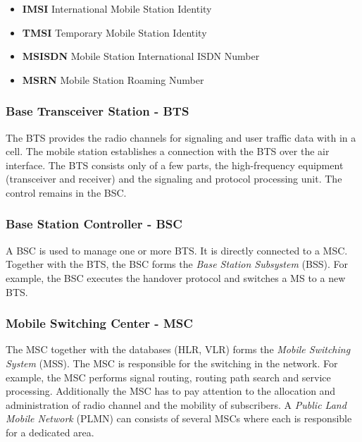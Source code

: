 \documentclass[master,english]{hgbthesis}
\begin{document}
\begin{itemize}

	\item \textbf{IMSI} International Mobile Station Identity

	\item \textbf{TMSI} Temporary Mobile Station Identity

	\item \textbf{MSISDN} Mobile Station International ISDN Number

	\item \textbf{MSRN} Mobile Station Roaming Number

\end{itemize}

\subsubsection{Base Transceiver Station - BTS}

The BTS provides the radio channels for signaling and user traffic data with in a cell. The mobile station establishes a connection with the BTS over the air interface. The BTS consists only of a few parts, the high-frequency equipment (transceiver and receiver) and the signaling and protocol processing unit. The control remains in the BSC.

\subsubsection{Base Station Controller - BSC}

A BSC is used to manage one or more BTS. It is directly connected to a MSC. Together with the BTS, the BSC forms the \emph{Base Station Subsystem} (BSS). For example, the BSC executes the handover protocol and switches a MS to a new BTS.

\subsubsection{Mobile Switching Center - MSC}

The MSC together with the databases (HLR, VLR) forms the \emph{Mobile Switching System} (MSS). The MSC is responsible for the switching in the network. For example, the MSC performs signal routing, routing path search and service processing. Additionally the MSC has to pay attention to the allocation and administration of radio channel and the mobility of subscribers. A \emph{Public Land Mobile Network} (PLMN) can consists of several MSCs where each is responsible for a dedicated area.
\end{document}
